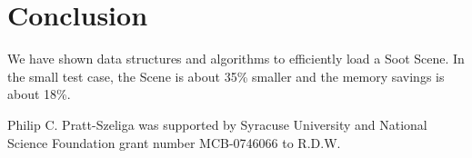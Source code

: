 \documentclass{sigplanconf}
\begin{document}
\section{Conclusion}
\label{sec:conclusion}
We have shown data structures and algorithms to efficiently load a Soot Scene. In the small test case, the Scene is about 35\% smaller and the memory savings is about 18\%.

\acks
Philip C. Pratt-Szeliga was supported by Syracuse University and National Science Foundation grant number MCB-0746066 to R.D.W.









\end{document}
